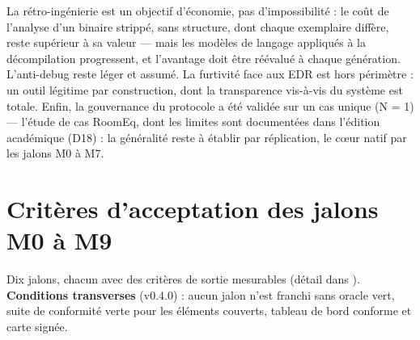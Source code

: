 La rétro-ingénierie est un objectif d'économie, pas d'impossibilité : le coût de l'analyse
d'un binaire strippé, sans structure, dont chaque exemplaire diffère, reste supérieur à sa
valeur — mais les modèles de langage appliqués à la décompilation progressent, et
l'avantage doit être réévalué à chaque génération. L'anti-debug reste léger et assumé.
La furtivité face aux EDR est hors périmètre : un outil légitime par construction, dont
la transparence vis-à-vis du système est totale. Enfin, la gouvernance du protocole a été
validée sur un cas unique (N = 1) — l'étude de cas RoomEq, dont les limites sont
documentées dans l'édition académique (D18) : la généralité reste à établir par
réplication, le cœur natif par les jalons M0 à M7.

\section{Critères d'acceptation des jalons M0 à M9}\label{sec:jalons}

Dix jalons, chacun avec des critères de sortie mesurables (détail dans
). \textbf{Conditions transverses} (v0.4.0) : aucun jalon n'est
franchi sans oracle vert, suite de conformité verte pour les éléments couverts, tableau de
bord conforme et carte signée.

